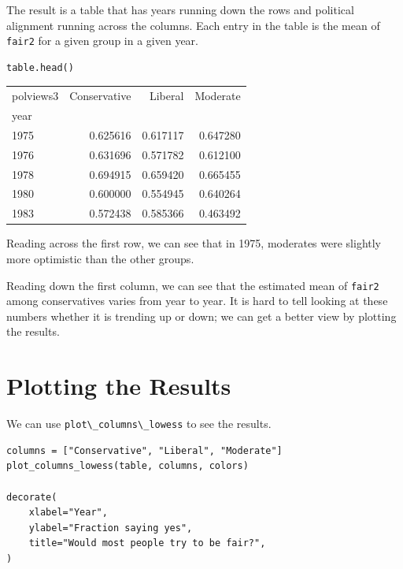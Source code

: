 The result is a table that has years running down the rows and political
alignment running across the columns. Each entry in the table is the
mean of \passthrough{\lstinline!fair2!} for a given group in a given
year.

\begin{lstlisting}[]
table.head()
\end{lstlisting}

\begin{tabular}{lrrr}
\midrule
polviews3 &  Conservative &   Liberal &  Moderate \\
year &               &           &           \\
\midrule
1975 &      0.625616 &  0.617117 &  0.647280 \\
1976 &      0.631696 &  0.571782 &  0.612100 \\
1978 &      0.694915 &  0.659420 &  0.665455 \\
1980 &      0.600000 &  0.554945 &  0.640264 \\
1983 &      0.572438 &  0.585366 &  0.463492 \\
\midrule
\end{tabular}

Reading across the first row, we can see that in 1975, moderates were
slightly more optimistic than the other groups.

Reading down the first column, we can see that the estimated mean of
\passthrough{\lstinline!fair2!} among conservatives varies from year to
year. It is hard to tell looking at these numbers whether it is trending
up or down; we can get a better view by plotting the results.

\hypertarget{plotting-the-results}{%
\section{Plotting the Results}\label{plotting-the-results}}

We can use \passthrough{\lstinline!plot\_columns\_lowess!} to see the
results.

\begin{lstlisting}[]
columns = ["Conservative", "Liberal", "Moderate"]
plot_columns_lowess(table, columns, colors)

decorate(
    xlabel="Year",
    ylabel="Fraction saying yes",
    title="Would most people try to be fair?",
)
\end{lstlisting}


